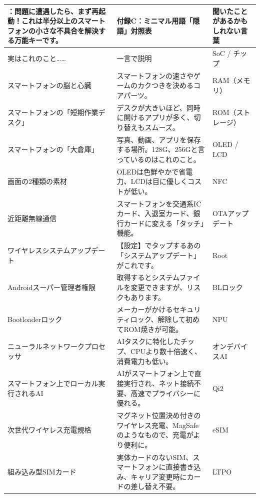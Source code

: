 
\begin{center}
\begin{tabularx}{\linewidth}{|X|X|X|}
\hline
\textbf{：問題に遭遇したら、まず再起動！これは半分以上のスマートフォンの小さな不具合を解決する万能キーです。} & \textbf{付録C：ミニマル用語「隠語」対照表} & \textbf{聞いたことがあるかもしれない言葉} \tabularnewline
\hline
実はこれのこと…… & 一言で説明 & SoC / チップ \tabularnewline
スマートフォンの脳と心臓 & スマートフォンの速さやゲームのカクつきを決めるコアパーツ。 & RAM（メモリ） \tabularnewline
スマートフォンの「短期作業デスク」 & デスクが大きいほど、同時に開けるアプリが多く、切り替えもスムーズ。 & ROM（ストレージ） \tabularnewline
スマートフォンの「大倉庫」 & 写真、動画、アプリを保存する場所。128G、256Gと言っているのはこれのこと。 & OLED / LCD \tabularnewline
画面の2種類の素材 & OLEDは色鮮やかで省電力、LCDは目に優しくコストが低い。 & NFC \tabularnewline
近距離無線通信 & スマートフォンを交通系ICカード、入退室カード、銀行カードに変える「タッチ」機能。 & OTAアップデート \tabularnewline
ワイヤレスシステムアップデート & 【設定】でタップするあの「システムアップデート」がこれです。 & Root \tabularnewline
Androidスーパー管理者権限 & 取得するとシステムファイルを変更できますが、リスクもあります。 & BLロック \tabularnewline
Bootloaderロック & メーカーがかけるセキュリティロック、解除して初めてROM焼きが可能。 & NPU \tabularnewline
ニューラルネットワークプロセッサ & AIタスクに特化したチップ、CPUより数十倍速く、消費電力も低い。 & オンデバイスAI \tabularnewline
スマートフォン上でローカル実行されるAI & AIがスマートフォン上で直接実行され、ネット接続不要、高速でプライバシーに優れる。 & Qi2 \tabularnewline
次世代ワイヤレス充電規格 & マグネット位置決め付きのワイヤレス充電、MagSafeのようなもので、充電がより便利に。 & eSIM \tabularnewline
組み込み型SIMカード & 実体カードのないSIM、スマートフォンに直接書き込み、キャリア変更時にカードの差し替え不要。 & LTPO \tabularnewline
\hline
\end{tabularx}
\end{center}
